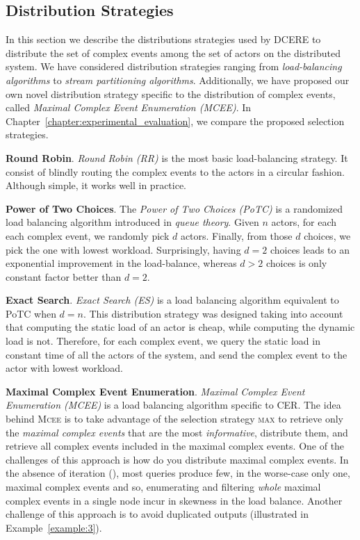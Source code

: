 \subsection{Distribution Strategies}\label{subsec:dcere:distribution-strategies}

In this section we describe the distributions strategies used by DCERE to distribute the set of complex events among the set of actors on the distributed system. We have considered distribution strategies ranging from \emph{load-balancing algorithms} to \emph{stream partitioning algorithms}. Additionally, we have proposed our own novel distribution strategy specific to the distribution of complex events, called \emph{Maximal Complex Event Enumeration (MCEE)}. In Chapter~\ref{chapter:experimental_evaluation}, we compare the proposed selection strategies.

\textbf{Round Robin}. \emph{Round Robin (RR)} is the most basic load-balancing strategy. It consist of blindly routing the complex events to the actors in a circular fashion. Although simple, it works well in practice.

\textbf{Power of Two Choices}. The \emph{Power of Two Choices (PoTC)} \cite{load-balancing-1} is a randomized load balancing algorithm introduced in \emph{queue theory}. Given $n$ actors, for each each complex event, we randomly pick $d$ actors. Finally, from those $d$ choices, we pick the one with lowest workload. Surprisingly, having $d = 2$ choices leads to an exponential improvement in the load-balance, whereas $d > 2$ choices is only constant factor better than $d = 2$.

\textbf{Exact Search}. \emph{Exact Search (ES)} is a load balancing algorithm equivalent to PoTC when $d = n$. This distribution strategy was designed taking into account that computing the static load of an actor is cheap, while computing the dynamic load is not. Therefore, for each complex event, we query the static load in constant time of all the actors of the system, and send the complex event to the actor with lowest workload.

\textbf{Maximal Complex Event Enumeration}. \emph{Maximal Complex Event Enumeration (MCEE)} is a load balancing algorithm specific to CER. The idea behind \textsc{Mcee} is to take advantage of the selection strategy \textsc{max} to retrieve only the \emph{maximal complex events} that are the most \emph{informative}, distribute them, and retrieve all complex events included in the maximal complex events. One of the challenges of this approach is how do you distribute maximal complex events. In the absence of iteration (\code{+}), most queries produce few, in the worse-case only one, maximal complex events and so, enumerating and filtering \emph{whole} maximal complex events in a single node incur in skewness in the load balance. Another challenge of this approach is to avoid duplicated outputs (illustrated in Example~\ref{example:3}).

